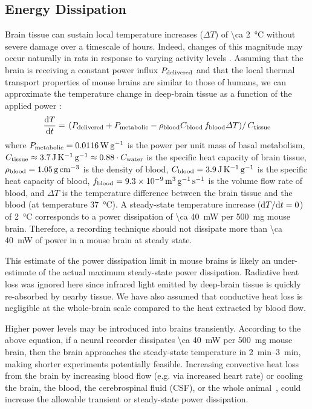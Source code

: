 \subsection{Energy Dissipation}

Brain tissue can sustain local temperature increases ($\Delta T$) of \SI{\ca 2}{\celsius} without severe damage over a timescale of hours. Indeed, changes of this magnitude may occur naturally in rats in response to varying activity levels \cite{Wolf2008}.
Assuming that the brain is receiving a constant power influx $P_{\text{\scriptsize delivered}}$ and that the local thermal transport properties of mouse brains are similar to those of humans, we can approximate the temperature change in deep-brain tissue as a function of the applied power \cite{sotero11, Lazzi2005}:
\[\frac{\text{d} T}{\text{d} t} = \left.\left(P_{\text{\scriptsize delivered}} + P_{\text{\scriptsize metabolic}} - \rho_{\text{\scriptsize blood}} C_{\text{\scriptsize blood}}\,f_{\text{\scriptsize blood}} \Delta T\right)\right/C_{\text{\scriptsize tissue}}\]
where $P_{\text{\scriptsize metabolic}} = \SI{0.0116}{\watt\per\gram}$ is the power per unit mass of basal metabolism, $C_{\text{\scriptsize tissue}} \approx \SI{3.7}{\joule\per\kelvin\per\gram} \approx 0.88\cdot C_{\text{\scriptsize water}}$ is the specific heat capacity of brain tissue, $\rho_{\text{\scriptsize blood}}=\SI{1.05}{\gram\per\centi\meter\cubed}$ is the density of blood, $C_{\text{\scriptsize blood}} = \SI{3.9}{\joule\per\kelvin\per\gram}$ is the specific heat capacity of blood, $f_{\text{\scriptsize blood}} = \SI{9.3e-9}{\meter\cubed\per\gram\per\second}$ is the volume flow rate of blood, and $\Delta T$ is the temperature difference between the brain tissue and the blood (at temperature \SI{37}{\celsius}).
A steady-state temperature increase ($\text{d} T/\text{d} t = 0$) of \SI{2}{\celsius} corresponds to a power dissipation of \SI{\ca 40}{\milli\watt} per \SI{500}{\milli\gram} mouse brain.
Therefore, a recording technique should not dissipate more than \SI{\ca 40}{\milli\watt} of power in a mouse brain at steady state.

This estimate of the power dissipation limit in mouse brains is likely an under-estimate of the actual maximum steady-state power dissipation. 
Radiative heat loss was ignored here since infrared light emitted by deep-brain tissue is quickly re-absorbed by nearby tissue.
We have also assumed that conductive heat loss is negligible at the whole-brain scale compared to the heat extracted by blood flow.

Higher power levels may be introduced into brains transiently.
According to the above equation, if a neural recorder dissipates \SI{\ca 40}{\milli\watt} per \SI{500}{\milli\gram} mouse brain, then the brain approaches the steady-state temperature in \SIrange{2}{3}{\minute}, making shorter experiments potentially feasible.
Increasing convective heat loss from the brain by increasing blood flow (e.g. via increased heart rate) or cooling the brain, the blood, the cerebrospinal fluid (CSF), or the whole animal~\cite{polderman2004}, could increase the allowable transient or steady-state power dissipation.

